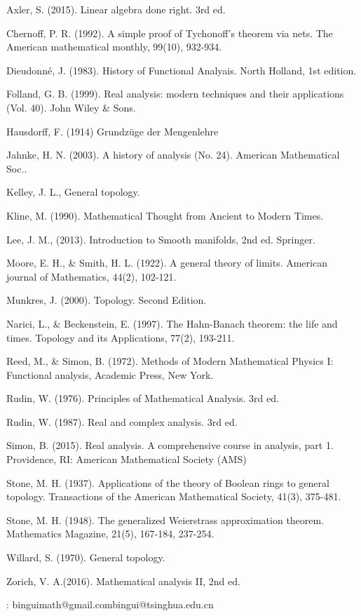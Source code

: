 \documentclass[12pt,b5paper,notitlepage]{article}
\theoremstyle{definition}
\theoremstyle{plain}
\numberwithin{equation}{section}
\begin{document}
	\begin{thebibliography}{999999}
		\footnotesize	

Axler, S. (2015). Linear algebra done right. 3rd ed.

Chernoff, P. R. (1992). A simple proof of Tychonoff's theorem via nets. The American mathematical monthly, 99(10), 932-934.


Dieudonné, J. (1983). History of Functional Analyais. North Holland, 1st edition.

Folland, G. B. (1999). Real analysis: modern techniques and their applications (Vol. 40). John Wiley \& Sons.


Hausdorff, F. (1914) Grundz\"uge der Mengenlehre

Jahnke, H. N. (2003). A history of analysis (No. 24). American Mathematical Soc..


Kelley, J. L., General topology. 

Kline, M. (1990). Mathematical Thought from Ancient to Modern Times.

Lee, J. M., (2013). Introduction to Smooth manifolds, 2nd ed. Springer.

Moore, E. H., \& Smith, H. L. (1922). A general theory of limits. American journal of Mathematics, 44(2), 102-121.

Munkres, J. (2000). Topology. Second Edition.

Narici, L., \& Beckenstein, E. (1997). The Hahn-Banach theorem: the life and times. Topology and its Applications, 77(2), 193-211.

Reed, M., \& Simon, B. (1972). Methods of Modern Mathematical Physics I: Functional analysis, Academic Press, New York.


Rudin, W. (1976). Principles of Mathematical Analysis. 3rd ed.

Rudin, W. (1987). Real and complex analysis. 3rd ed. 

Simon, B. (2015). Real analysis. A comprehensive course in analysis, part 1. Providence, RI: American Mathematical Society (AMS)

Stone, M. H. (1937). Applications of the theory of Boolean rings to general topology. Transactions of the American Mathematical Society, 41(3), 375-481.

Stone, M. H. (1948). The generalized Weierstrass approximation theorem. Mathematics Magazine, 21(5), 167-184, 237-254.


Willard, S. (1970). General topology. 

Zorich, V. A.(2016). Mathematical analysis II, 2nd ed.

		
\end{thebibliography}


: binguimath@gmail.com\qquad bingui@tsinghua.edu.cn
\end{document}
